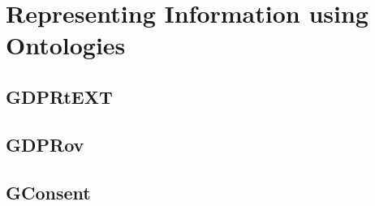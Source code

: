 \chapter{Representing Information using Ontologies}
\label{chapter:vocabularies}

\section{GDPRtEXT}\label{sec:voc:GDPRtEXT}

\section{GDPRov}\label{sec:voc:GDPRov}

\section{GConsent}\label{sec:voc:GConsent}